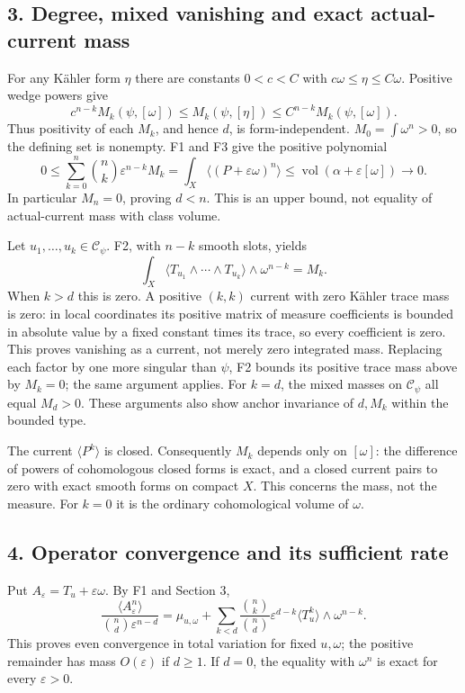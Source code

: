 \documentclass[
  10pt,
]{article}
\begin{document}
\subsection{3. Degree, mixed vanishing and exact actual-current
mass}\label{degree-mixed-vanishing-and-exact-actual-current-mass}

For any Kähler form \(\eta\) there are constants \(0<c<C\) with
\(c\omega\leq\eta\leq C\omega\). Positive wedge powers give \[
c^{n-k}M_k(\psi,[\omega])\leq M_k(\psi,[\eta])\leq C^{n-k}M_k(\psi,[\omega]).
\] Thus positivity of each \(M_k\), and hence \(d\), is
form-independent. \(M_0=\int\omega^n>0\), so the defining set is
nonempty. F1 and F3 give the positive polynomial \[
0\leq\sum_{k=0}^n\binom nk\varepsilon^{n-k}M_k
=\int_X\langle(P+\varepsilon\omega)^n\rangle
\leq\operatorname{vol}(\alpha+\varepsilon[\omega])\longrightarrow0.
\] In particular \(M_n=0\), proving \(d<n\). This is an upper bound, not
equality of actual-current mass with class volume.

Let \(u_1,\ldots,u_k\in\mathcal C_\psi\). F2, with \(n-k\) smooth slots,
yields \[
\int_X\langle T_{u_1}\wedge\cdots\wedge T_{u_k}\rangle\wedge\omega^{n-k}=M_k.
\] When \(k>d\) this is zero. A positive \((k,k)\) current with zero
Kähler trace mass is zero: in local coordinates its positive matrix of
measure coefficients is bounded in absolute value by a fixed constant
times its trace, so every coefficient is zero. This proves vanishing as
a current, not merely zero integrated mass. Replacing each factor by one
more singular than \(\psi\), F2 bounds its positive trace mass above by
\(M_k=0\); the same argument applies. For \(k=d\), the mixed masses on
\(\mathcal C_\psi\) all equal \(M_d>0\). These arguments also show
anchor invariance of \(d,M_k\) within the bounded type.

The current \(\langle P^k\rangle\) is closed. Consequently \(M_k\)
depends only on \([\omega]\): the difference of powers of cohomologous
closed forms is exact, and a closed current pairs to zero with exact
smooth forms on compact \(X\). This concerns the mass, not the measure.
For \(k=0\) it is the ordinary cohomological volume of \(\omega\).

\subsection{4. Operator convergence and its sufficient
rate}\label{operator-convergence-and-its-sufficient-rate}

Put \(A_\varepsilon=T_u+\varepsilon\omega\). By F1 and Section 3, \[
\frac{\langle A_\varepsilon^n\rangle}{\binom nd\varepsilon^{n-d}}
=\mu_{u,\omega}+\sum_{k<d}\frac{\binom nk}{\binom nd}\varepsilon^{d-k}
\langle T_u^k\rangle\wedge\omega^{n-k}.
\] This proves even convergence in total variation for fixed
\(u,\omega\); the positive remainder has mass \(O(\varepsilon)\) if
\(d\geq1\). If \(d=0\), the equality with \(\omega^n\) is exact for
every \(\varepsilon>0\).
\end{document}
